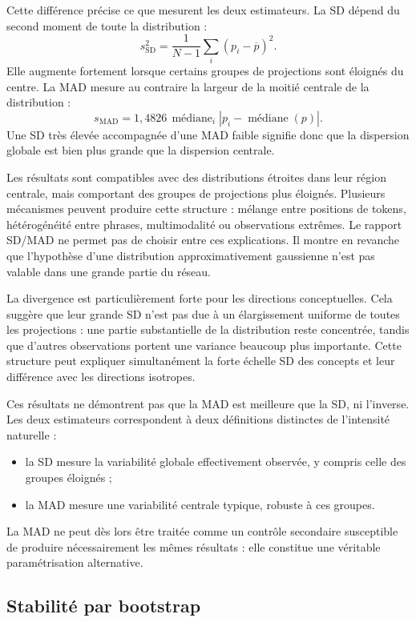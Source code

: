 \documentclass[a4paper,10pt]{article}
\begin{document}
Cette différence précise ce que mesurent les deux estimateurs. La SD dépend du
second moment de toute la distribution :
\[
s_{\mathrm{SD}}^2
=
\frac{1}{N-1}\sum_i(p_i-\overline p)^2.
\]
Elle augmente fortement lorsque certains groupes de projections sont éloignés
du centre. La MAD mesure au contraire la largeur de la moitié centrale de la
distribution :
\[
s_{\mathrm{MAD}}
=
1{,}4826\,\operatorname{médiane}_i
\left|p_i-\operatorname{médiane}(p)\right|.
\]
Une SD très élevée accompagnée d'une MAD faible signifie donc que la dispersion
globale est bien plus grande que la dispersion centrale.

Les résultats sont compatibles avec des distributions étroites dans leur région
centrale, mais comportant des groupes de projections plus éloignés. Plusieurs
mécanismes peuvent produire cette structure : mélange entre positions de tokens,
hétérogénéité entre phrases, multimodalité ou observations extrêmes. Le rapport
SD/MAD ne permet pas de choisir entre ces explications. Il montre en revanche
que l'hypothèse d'une distribution approximativement gaussienne n'est pas
valable dans une grande partie du réseau.

La divergence est particulièrement forte pour les directions conceptuelles.
Cela suggère que leur grande SD n'est pas due à un élargissement uniforme de
toutes les projections : une partie substantielle de la distribution reste
concentrée, tandis que d'autres observations portent une variance beaucoup plus
importante. Cette structure peut expliquer simultanément la forte échelle SD
des concepts et leur différence avec les directions isotropes.

Ces résultats ne démontrent pas que la MAD est meilleure que la SD, ni
l'inverse. Les deux estimateurs correspondent à deux définitions distinctes de
l'intensité naturelle :

\begin{itemize}
  \item la SD mesure la variabilité globale effectivement observée, y compris
        celle des groupes éloignés ;
  \item la MAD mesure une variabilité centrale typique, robuste à ces groupes.
\end{itemize}

La MAD ne peut dès
lors être traitée comme un contrôle secondaire susceptible de produire
nécessairement les mêmes résultats : elle constitue une véritable
paramétrisation alternative.

\subsection{Stabilité par bootstrap}
\end{document}

